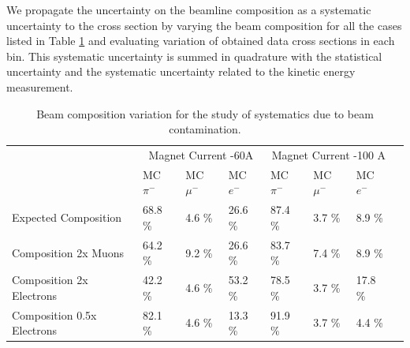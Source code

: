 We propagate the uncertainty on the beamline composition  as a systematic uncertainty to the cross section by varying the beam composition for all the cases listed in Table \ref{tab:beamlineSys} and evaluating variation of obtained  data cross sections in each bin. This systematic uncertainty is summed in quadrature with the statistical uncertainty and the systematic uncertainty related to the kinetic energy measurement.


\begin{table}[p]
\centering
\begin{tabular}{| l | l | l | l | l | l | l | l | }
\hline
 &  \multicolumn{3}{|c|}{Magnet Current -60A} & \multicolumn{3}{|c|}{Magnet Current -100 A}\\

                                                  & MC $\pi^-$   & MC  $ \mu^-$ & MC  $e^-$ & MC  $\pi^-$ & MC  $\mu^-$ & MC  $e^-$  \\
\hline
Expected Composition          & 68.8	\%&4.6 \%&	26.6 \%&	87.4 \%&	3.7	\%&8.9 \% \\
Composition 2x Muons          & 64.2	\%&9.2 \%&	26.6 \%&	83.7 \%&	7.4	\%&8.9 \% \\
Composition 2x Electrons      &42.2	\%&4.6 \%&	53.2 \%&	78.5	\%&  3.7	\%&17.8 \%\\
Composition 0.5x Electrons   &82.1	\%&4.6 \%&	13.3 \%&	91.9 \%&	3.7	\%&4.4 \% \\
\hline
\end{tabular}
\caption{Beam composition variation for the study of systematics due to beam contamination.}
\label{tab:beamlineSys}
\end{table}

